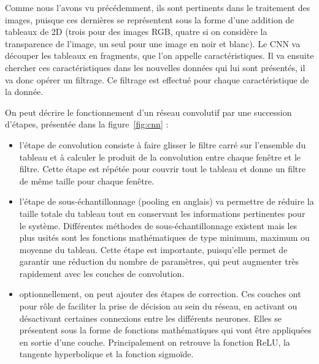 

Comme nous l'avons vu précédemment, ils sont pertinents dans le traitement des images, puisque ces dernières se représentent sous la forme d'une addition de tableaux de 2D (trois pour des images RGB, quatre si on considère la transparence de l'image, un seul pour une image en noir et blanc).
Le CNN va découper les tableaux en fragments, que l'on appelle caractéristiques. Il va ensuite chercher ces caractéristiques dans les nouvelles données qui lui sont présentés, il va donc opérer un filtrage. Ce filtrage est effectué pour chaque caractéristique de la donnée.

On peut décrire le fonctionnement d'un réseau convolutif par une succession d'étapes, présentée dans la figure~\ref{fig:cnn} :

\begin{itemize}
  \item l'étape de convolution consiste à faire glisser le filtre carré sur l'ensemble du tableau et à calculer le produit de la convolution entre chaque fenêtre et le filtre. Cette étape est répétée pour couvrir tout le tableau et donne un filtre de même taille pour chaque fenêtre.
  \item l'étape de sous-échantillonnage (pooling en anglais) va permettre de réduire la taille totale du tableau tout en conservant les informations pertinentes pour le système. Différentes méthodes de sous-échantillonnage existent mais les plus usités sont les fonctions mathématiques de type minimum, maximum ou moyenne du tableau. Cette étape est importante, puisqu'elle permet de garantir une réduction du nombre de paramètres, qui peut augmenter très rapidement avec les couches de convolution.
  \item optionnellement, on peut ajouter des étapes de correction. Ces couches ont pour rôle de faciliter la prise de décision au sein du réseau, en activant ou désactivant certaines connexions entre les différents neurones. Elles se présentent sous la forme de fonctions mathématiques qui vont être appliquées en sortie d'une couche. Principalement on retrouve la fonction ReLU, la tangente hyperbolique et la fonction sigmoïde.
\end{itemize}

